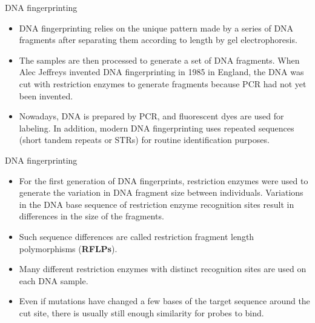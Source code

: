 \documentclass[ignorenonframetext,aspectratio=169]{beamer}
\providecommand{\tightlist}{%
  \setlength{\itemsep}{0pt}\setlength{\parskip}{0pt}}
\begin{document}
\begin{frame}{DNA fingerprinting}
\protect\hypertarget{dna-fingerprinting}{}

\begin{itemize}
\tightlist
\item
  DNA fingerprinting relies on the unique pattern made by a series of
  DNA fragments after separating them according to length by gel
  electrophoresis.
\item
  The samples are then processed to generate a set of DNA fragments.
  When Alec Jeffreys invented DNA fingerprinting in 1985 in England, the
  DNA was cut with restriction enzymes to generate fragments because PCR
  had not yet been invented.
\item
  Nowadays, DNA is prepared by PCR, and fluorescent dyes are used for
  labeling. In addition, modern DNA fingerprinting uses repeated
  sequences (short tandem repeats or STRs) for routine identification
  purposes.
\end{itemize}

\end{frame}

\begin{frame}{DNA fingerprinting}
\protect\hypertarget{dna-fingerprinting-1}{}

\begin{itemize}
\tightlist
\item
  For the first generation of DNA fingerprints, restriction enzymes were
  used to generate the variation in DNA fragment size between
  individuals. Variations in the DNA base sequence of restriction enzyme
  recognition sites result in differences in the size of the fragments.
\item
  Such sequence differences are called restriction fragment length
  polymorphisms (\textbf{RFLPs}).
\item
  Many different restriction enzymes with distinct recognition sites are
  used on each DNA sample.
\item
  Even if mutations have changed a few bases of the target sequence
  around the cut site, there is usually still enough similarity for
  probes to bind.
\end{itemize}

\end{frame}
\end{document}
